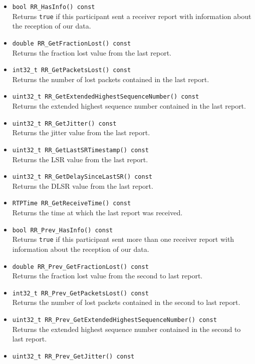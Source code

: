 \documentclass[12pt,a4paper]{article}
\begin{document}
\begin{itemize}
					\item {\tt bool RR\_HasInfo() const}\\
						Returns {\tt true} if this participant sent a receiver report with information
						about the reception of our data.
					\item {\tt double RR\_GetFractionLost() const}\\
						Returns the fraction lost value from the last report.
					\item {\tt int32\_t	RR\_GetPacketsLost() const}\\
						Returns the number of lost packets contained in the last report.
					\item {\tt uint32\_t RR\_GetExtendedHighestSequenceNumber() const}\\
						Returns the extended highest sequence number contained in the last report.
					\item {\tt uint32\_t RR\_GetJitter() const}\\
						Returns the jitter value from the last report.
					\item {\tt uint32\_t RR\_GetLastSRTimestamp() const}\\
						Returns the LSR value from the last report.
					\item {\tt uint32\_t RR\_GetDelaySinceLastSR() const}\\
						Returns the DLSR value from the last report.
					\item {\tt RTPTime RR\_GetReceiveTime() const}\\
						Returns the time at which the last report was received.
					\item {\tt bool RR\_Prev\_HasInfo() const}\\
						Returns {\tt true} if this participant sent more than one receiver report with information
						about the reception of our data.
					\item {\tt double RR\_Prev\_GetFractionLost() const}\\
						Returns the fraction lost value from the second to last report.
					\item {\tt int32\_t	RR\_Prev\_GetPacketsLost() const}\\
						Returns the number of lost packets contained in the second to last report.
					\item {\tt uint32\_t RR\_Prev\_GetExtendedHighestSequenceNumber() const}\\
						Returns the extended highest sequence number contained in the second to last report.
					\item {\tt uint32\_t RR\_Prev\_GetJitter() const}\\

\end{itemize}
\end{document}
